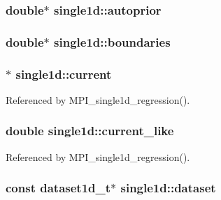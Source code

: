 \subsubsection[{\texorpdfstring{autoprior}{autoprior}}]{\setlength{\rightskip}{0pt plus 5cm}double$\ast$ single1d\+::autoprior}\hypertarget{structsingle1d_a802abe6c87cc2ba23412f106b757739f}{}\label{structsingle1d_a802abe6c87cc2ba23412f106b757739f}
\subsubsection[{\texorpdfstring{boundaries}{boundaries}}]{\setlength{\rightskip}{0pt plus 5cm}double$\ast$ single1d\+::boundaries}\hypertarget{structsingle1d_a8b9a4b875f71341ef2bbfc58c59b526e}{}\label{structsingle1d_a8b9a4b875f71341ef2bbfc58c59b526e}
\subsubsection[{\texorpdfstring{current}{current}}]{$\ast$ single1d\+::current}\hypertarget{structsingle1d_a7bd06a9ab4600604406abb5cfcbf1906}{}\label{structsingle1d_a7bd06a9ab4600604406abb5cfcbf1906}


Referenced by M\+P\+I\+\_\+single1d\+\_\+regression().

\subsubsection[{\texorpdfstring{current\+\_\+like}{current_like}}]{\setlength{\rightskip}{0pt plus 5cm}double single1d\+::current\+\_\+like}\hypertarget{structsingle1d_ad732cdca6871b69c57674560e5bd7b70}{}\label{structsingle1d_ad732cdca6871b69c57674560e5bd7b70}


Referenced by M\+P\+I\+\_\+single1d\+\_\+regression().

\subsubsection[{\texorpdfstring{dataset}{dataset}}]{\setlength{\rightskip}{0pt plus 5cm}const {\bf dataset1d\+\_\+t}$\ast$ single1d\+::dataset}\hypertarget{structsingle1d_ab4e457d5bc572feca1d1ffca7f532120}{}\label{structsingle1d_ab4e457d5bc572feca1d1ffca7f532120}


